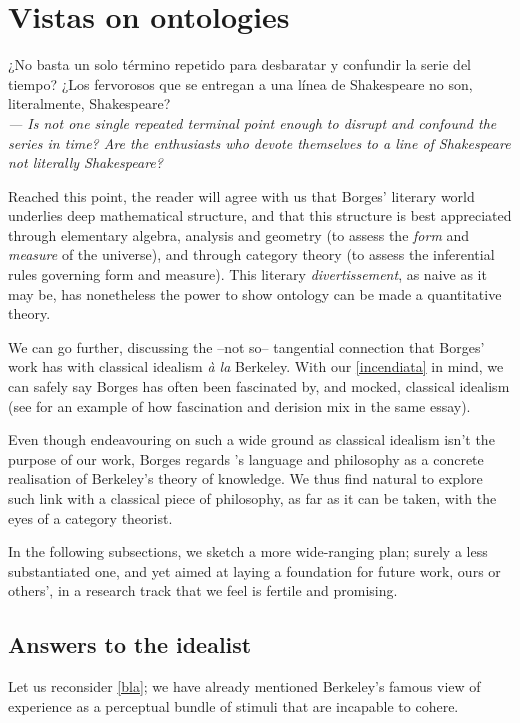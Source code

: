 \section{Vistas on ontologies}\label{vistas}
\epigraph{¿No basta un solo término repetido para desbaratar y confundir la serie del tiempo? ¿Los fervorosos que se entregan a una línea de Shakespeare no son, literalmente, Shakespeare?\\[2mm]
\footnotesize\emph{--- Is not one single repeated terminal point
enough to disrupt and confound the series in time? Are the enthusiasts who
devote themselves to a line of Shakespeare not literally Shakespeare?}
}{\cite{confutacion}}
Reached this point, the reader will agree with us that Borges' literary world underlies deep mathematical structure, and that this structure is best appreciated through elementary algebra, analysis and geometry (to assess the \emph{form} and \emph{measure} of the universe), and through category theory (to assess the inferential rules governing form and measure). This literary \emph{divertissement}, as naive as it may be, has nonetheless the power to show ontology can be made a quantitative theory.

We can go further, discussing the --not so-- tangential connection that Borges' work has with classical idealism \emph{à la} Berkeley. With our \autoref{incendiata} in mind, we can safely say Borges has often been fascinated by, and mocked, classical idealism (see \cite{confutacion} for an example of how fascination and derision mix in the same essay).

Even though endeavouring on such a wide ground as classical idealism isn't the purpose of our work, Borges regards \tlon's language and philosophy as a concrete realisation of Berkeley's theory of knowledge. We thus find natural to explore such link with a classical piece of philosophy, as far as it can be taken, with the eyes of a category theorist.

In the following subsections, we sketch a more wide-ranging plan; surely a less substantiated one, and yet aimed at laying a foundation for future work, ours or others', in a research track that we feel is fertile and promising.
\subsection{Answers to the idealist}\label{berkelei}
Let us reconsider \autoref{bla}; we have already mentioned Berkeley's famous view of experience as a perceptual bundle of stimuli that are incapable to cohere.


